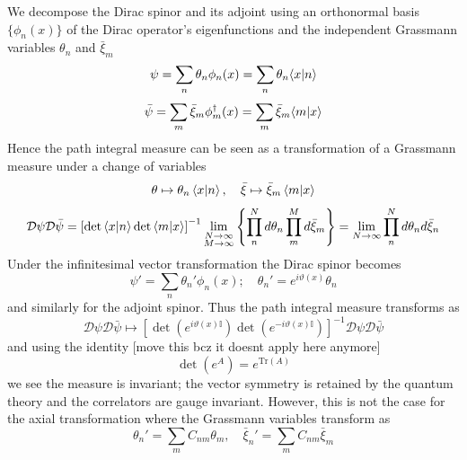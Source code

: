 \documentclass[11pt, a4paper]{article}
\theoremstyle{definition}
\theoremstyle{plain}
\begin{document}
We decompose the Dirac spinor and its adjoint using an orthonormal basis $\{ \phi_n(x) \}$ of
the Dirac operator's eigenfunctions and the independent Grassmann variables 
$\theta_n$ and $\bar{\xi}_m$
\begin{equation}
  \psi = \sum_n{\theta_n\phi_n(x)} = \sum_n{\theta_n\!\braket{x|n}}
\end{equation}
\begin{equation}
  \bar{\psi} = \sum_m{\bar{\xi}_m\phi^{\dagger}_m(x)} = \sum_m{\bar{\xi}_m\!\braket{m|x}}
  \end{equation}
Hence the path integral measure can be seen as a transformation of a Grassmann measure
under a change of variables
\begin{equation}
  \theta \mapsto \theta_n\braket{x|n},\quad
  \bar{\xi} \mapsto \bar{\xi}_m\braket{m|x}
\end{equation}
\begin{equation}
  \mathcal{D}\psi\mathcal{D}\bar{\psi}
  = {\left[\det{\braket{x|n}}\det{\braket{m|x}}\right]}^{-1}
  \lim_{\substack{N \rightarrow \infty \\
  M \rightarrow \infty}}{\left\{ \prod_n^N{d\theta_n}\prod_m^M{d\bar{\xi}_m} \right\}}
  = \lim_{N \rightarrow \infty}{\prod_n^N{d\theta_n d\bar{\xi}_n}} 
\end{equation}
Under the infinitesimal vector transformation the Dirac spinor becomes
\begin{equation}
  \psi' = \sum_n{\theta_n'\phi_n(x)} ;\quad \theta_n' = e^{i\vartheta(x)}\theta_n
\end{equation}
and similarly for the adjoint spinor. Thus the path integral measure transforms as
\begin{equation}
  \mathcal{D}\psi\mathcal{D}\bar{\psi} \mapsto
  {\left[\det{\left(e^{i\vartheta(x)\mathbb{I}}\right)}
  \det{\left(e^{-i\vartheta(x)\mathbb{I}}\right)} \right]}^{-1}
  \mathcal{D}\psi\mathcal{D}\bar{\psi}
\end{equation}
and using the identity [move this bcz it doesnt apply here anymore]
\begin{equation}
  \det\left( e^{A}\right) = e^{\mathrm{Tr}(A)}
\end{equation}
we see the measure is invariant; the vector symmetry is retained
by the quantum theory and the correlators are gauge invariant.
However, this is not the case for the axial transformation
where the Grassmann variables transform as
\begin{equation}
  \theta_n' = \sum_m{C_{nm} \theta_m} ,\quad \bar{\xi}_n' = \sum_m{C_{nm} \bar{\xi}_m}
\end{equation}
\end{document}
